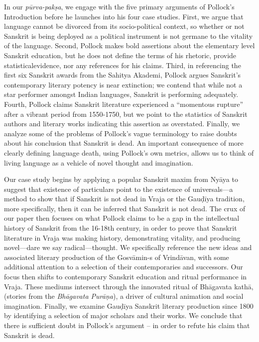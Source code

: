 In our {\sl pūrva-pakṣa}, we engage with the five primary arguments of Pollock’s Introduction before he launches into his four case studies. First, we argue that language cannot be divorced from its socio-political context, so whether or not Sanskrit is being deployed as a political instrument is not germane to the vitality of the language. Second, Pollock makes bold assertions about the elementary level Sanskrit education, but he does not define the terms of his rhetoric, provide statisticalevidence, nor any references for his claims. Third, in referencing the first six Sanskrit awards from the Sahitya Akademi, Pollock argues Sanskrit’s contemporary literary potency is near extinction; we contend that while not a star performer amongst Indian languages, Sanskrit is performing adequately. Fourth, Pollock claims Sanskrit literature experienced a “momentous rupture” after a vibrant period from 1550-1750, but we point to the statistics of Sanskrit authors and literary works indicating this assertion as overstated. Finally, we analyze some of the problems of Pollock’s vague terminology to raise doubts about his conclusion that Sanskrit is dead. An important consequence of more clearly defining language death, using Pollock’s own metrics, allows us to think of living language as a vehicle of novel thought and imagination. 
\vskip 2pt

Our case study begins by applying a popular Sanskrit maxim from Nyāya to suggest that existence of particulars point to the existence of universals—a method to show that if Sanskrit is not dead in Vraja or the Gauḍīya tradition, more specifically, then it can be inferred that Sanskrit is not dead. The crux of our paper then focuses on what Pollock claims to be a gap in the intellectual history of Sanskrit from the 16-18th century, in order to prove that Sanskrit literature in Vraja was making history, demonstrating vitality, and producing novel—dare we say radical—thought. We specifically reference the new ideas and associated literary production of the Gosvāmin-s of Vrindāvan, with some additional attention to a selection of their contemporaries and successors. Our focus then shifts to contemporary Sanskrit education and ritual performance in Vraja. These mediums intersect through the innovated ritual of Bhāgavata kathā, (stories from the {\sl Bhāgavata Purāṇa}), a driver of cultural animation and social imagination. Finally, we examine Gauḍīya Sanskrit literary production since 1800 by identifying a selection of major scholars and their works. We conclude that there is sufficient doubt in Pollock’s argument – in order to refute his claim that Sanskrit is dead. 

